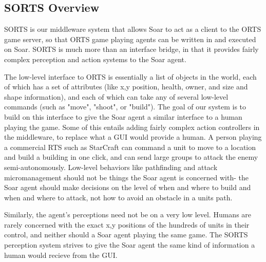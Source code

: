 \documentclass{article}
\begin{document}
\subsection{SORTS Overview}

SORTS is our middleware system that allows Soar to act as a client to the ORTS game server, so that ORTS game playing
agents can be written in and executed on Soar. SORTS is much more than
an interface bridge, in that it provides fairly complex perception and action systems to the Soar agent.

The low-level interface to ORTS is essentially a list of objects in the world, each of which has a set of attributes (like x,y position, health, owner, and size and shape information), and each of which can take any of several low-level commands (such as "move", "shoot", or "build"). The goal of our system is to build on this interface to give the Soar agent a similar interface to a human playing the game. Some of this entails adding fairly complex action controllers in the middleware, to replace what a GUI would provide a human. A person playing a commercial RTS such as StarCraft can command a unit to move to a location and build a building in one click, and can send large groups to attack the enemy semi-autonomously. Low-level behaviors like pathfinding and attack micromanagement should not be things the Soar agent is concerned with- the Soar agent should make decisions on the level of when and where to build and when and where to attack, not how to avoid an obstacle in a units path.

Similarly, the agent's perceptions need not be on a very low level. Humans are rarely concerned with the exact x,y positions of the hundreds of units in their control, and neither should a Soar agent playing the same game. The SORTS perception system strives to give the Soar agent the same kind of information a human would recieve from the GUI.








\end{document}
